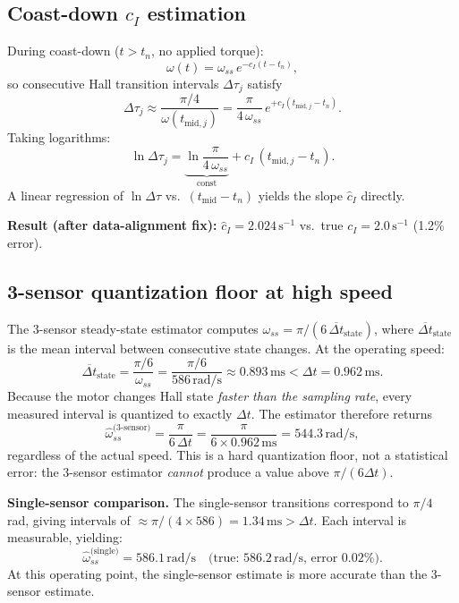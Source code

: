 \documentclass[11pt,a4paper]{article}
\begin{document}
\subsection{Coast-down $c_I$ estimation}

During coast-down ($t > t_n$, no applied torque):
\[
  \omega(t) = \omega_{ss}\,e^{-c_I(t-t_n)},
\]
so consecutive Hall transition intervals $\Delta\tau_j$ satisfy
\[
  \Delta\tau_j \approx \frac{\pi/4}{\omega(t_{\text{mid},j})}
  = \frac{\pi}{4\,\omega_{ss}}\,e^{+c_I(t_{\text{mid},j}-t_n)}.
\]
Taking logarithms:
\[
  \ln\Delta\tau_j = \underbrace{\ln\!\frac{\pi}{4\,\omega_{ss}}}_{\text{const}}
                   + c_I\,(t_{\text{mid},j} - t_n).
\]
A linear regression of $\ln\Delta\tau$ vs.\ $(t_{\text{mid}}-t_n)$ yields
the slope $\hat{c}_I$ directly.

\textbf{Result (after data-alignment fix):} $\hat{c}_I = 2.024\,\text{s}^{-1}$
vs.\ true $c_I = 2.0\,\text{s}^{-1}$ (1.2\% error).

\subsection{3-sensor quantization floor at high speed}

The 3-sensor steady-state estimator computes
$\omega_{ss} = \pi / (6\,\overline{\Delta t}_{\text{state}})$,
where $\overline{\Delta t}_{\text{state}}$ is the mean interval between
consecutive state changes.  At the operating speed:
\[
  \overline{\Delta t}_{\text{state}}
  = \frac{\pi/6}{\omega_{ss}}
  = \frac{\pi/6}{586\,\text{rad/s}}
  \approx 0.893\,\text{ms}
  < \Delta t = 0.962\,\text{ms}.
\]
Because the motor changes Hall state \emph{faster than the sampling rate},
every measured interval is quantized to exactly $\Delta t$.  The estimator
therefore returns
\[
  \hat{\omega}_{ss}^{\text{(3-sensor)}}
  = \frac{\pi}{6\,\Delta t}
  = \frac{\pi}{6 \times 0.962\,\text{ms}}
  = 544.3\,\text{rad/s},
\]
regardless of the actual speed.  This is a hard quantization floor, not a
statistical error: the 3-sensor estimator \emph{cannot} produce a value
above $\pi/(6\Delta t)$.

\textbf{Single-sensor comparison.}  The single-sensor transitions correspond
to $\pi/4$ rad, giving intervals of $\approx \pi/(4\times 586) = 1.34\,\text{ms} > \Delta t$.
Each interval is measurable, yielding:
\[
  \hat{\omega}_{ss}^{\text{(single)}} = 586.1\,\text{rad/s}
  \quad\text{(true: }586.2\,\text{rad/s, error }0.02\%).
\]
At this operating point, the single-sensor estimate is more accurate than
the 3-sensor estimate.
\end{document}
